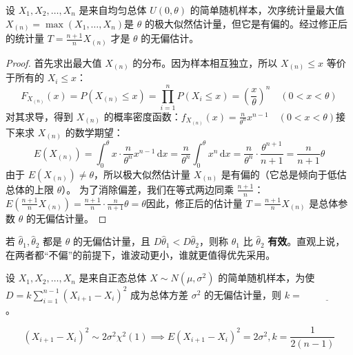 \documentclass[lang=cn,11pt]{elegantbook}
\begin{document}
\begin{proposition}[均匀分布参数的无偏估计]\label{prop:uniform-unbiased}
    设 $X_1, X_2, \dots, X_n$ 是来自均匀总体 $U(0, \theta)$ 的简单随机样本，次序统计量最大值 \(X_{(n)} = \max(X_1, \dots, X_n)\)是 $\theta$ 的极大似然估计量，但它是有偏的。经过修正后的统计量 $T = \frac{n+1}{n}X_{(n)}$ 才是 $\theta$ 的无偏估计。
\end{proposition}
\begin{proof}
    首先求出最大值 $X_{(n)}$ 的分布。因为样本相互独立，所以 $X_{(n)} \le x$ 等价于所有的 $X_i \le x$：$$F_{X_{(n)}}(x) = P(X_{(n)} \le x) = \prod_{i=1}^n P(X_i \le x) = \left(\frac{x}{\theta}\right)^n \quad (0 < x < \theta)$$对其求导，得到 $X_{(n)}$ 的概率密度函数：\(f_{X_{(n)}}(x) = \frac{n}{\theta^n}x^{n-1} \quad (0 < x < \theta)\)接下来求 $X_{(n)}$ 的数学期望：$$E(X_{(n)}) = \int_0^\theta x \cdot \frac{n}{\theta^n}x^{n-1}\,\mathrm{d}x = \frac{n}{\theta^n} \int_0^\theta x^n\,\mathrm{d}x = \frac{n}{\theta^n} \cdot \frac{\theta^{n+1}}{n+1} = \frac{n}{n+1}\theta$$由于 $E(X_{(n)}) \ne \theta$，所以极大似然估计量 $X_{(n)}$ 是有偏的（它总是倾向于低估总体的上限 $\theta$）。
    为了消除偏差，我们在等式两边同乘 $\frac{n+1}{n}$：\(E\left(\frac{n+1}{n}X_{(n)}\right) = \frac{n+1}{n} \cdot \frac{n}{n+1}\theta = \theta\)因此，修正后的估计量 $T = \frac{n+1}{n}X_{(n)}$ 是总体参数 $\theta$ 的无偏估计量。
\end{proof}


\begin{definition} \label{def:efficiency}
若 \(\hat{\theta}_1, \hat{\theta}_2\) 都是 \(\theta\) 的无偏估计量，且 \(D\hat{\theta}_1 < D\hat{\theta}_2\)，则称 \(\hat{\theta}_1\) 比 \(\hat{\theta}_2\) \textbf{有效}。直观上说，在两者都“不偏”的前提下，谁波动更小，谁就更值得优先采用。
\end{definition}

\begin{exercise}\label{exer:7-unbiased-diff}
设 \(X_1, X_2, \dots, X_n\) 是来自正态总体 \(X \sim N(\mu, \sigma^2)\) 的简单随机样本，为使
\(
D = k\sum_{i=1}^{n-1}(X_{i+1}-X_i)^2
\)
成为总体方差 \(\sigma^2\) 的无偏估计量，则 \(k =\,\underline{\hspace{2cm}}\)。
\end{exercise}
\begin{solution}
\[(X_{i+1}-X_i)^2\sim 2\sigma^2\chi^2(1)\implies E(X_{i+1}-X_i)^2=2\sigma^2,k=\frac{1}{2(n-1)}\]
\end{solution}
\end{document}
